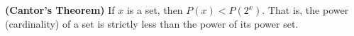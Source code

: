 \textbf{(Cantor's Theorem)} If $x$ is a set, then $P(x) < P(2^x)$. That is, the power (cardinality) of a set is strictly less than the power of its power set.
